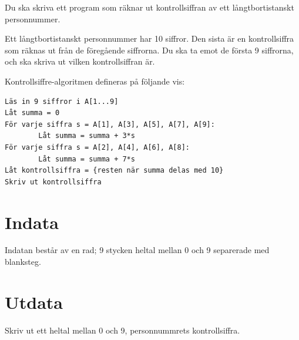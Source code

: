 
Du ska skriva ett program som räknar ut kontrollsiffran av ett långtbortistanskt personnummer.

Ett långtbortistanskt personnummer har 10 siffror. Den sista är en kontrollsiffra som räknas ut från de föregående siffrorna. Du ska ta emot de första 9 siffrorna, och ska skriva ut vilken kontrollsiffran är.

Kontrollsiffre-algoritmen defineras på följande vis:

\begin{verbatim}
Läs in 9 siffror i A[1...9]
Låt summa = 0
För varje siffra s = A[1], A[3], A[5], A[7], A[9]:
        Låt summa = summa + 3*s
För varje siffra s = A[2], A[4], A[6], A[8]:
        Låt summa = summa + 7*s
Låt kontrollsiffra = {resten när summa delas med 10}
Skriv ut kontrollsiffra
\end{verbatim}

\section*{Indata}
Indatan består av en rad; 9 stycken heltal mellan 0 och 9 separerade med blanksteg.

\section*{Utdata}
Skriv ut ett heltal mellan 0 och 9, personnummrets kontrollsiffra.
